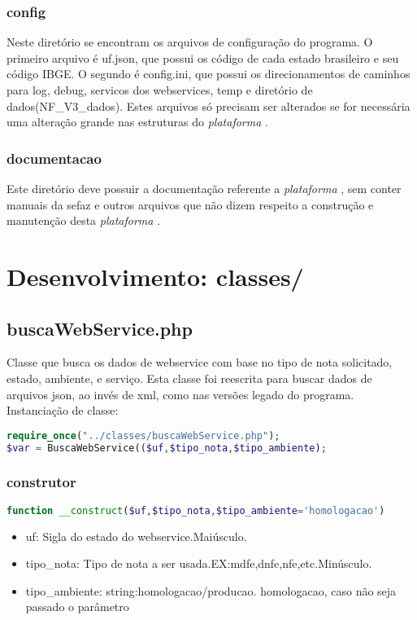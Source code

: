 \documentclass[a4paper]{article}
\newcommand{\nf}{\emph{plataforma} }
\begin{document}
\subsubsection{config}
Neste diretório se encontram os arquivos de configuração do programa. O primeiro arquivo é uf.json, que possui os código de cada estado brasileiro e seu código IBGE. O segundo é config.ini, que possui os direcionamentos de caminhos para log, debug, servicos dos webservices, temp e diretório de dados(NF\_V3\_dados). Estes arquivos só precisam ser alterados se for necessária uma alteração grande nas estruturas do \nf.

\subsubsection{documentacao}
Este diretório deve possuir a documentação referente a \nf, sem conter manuais da sefaz e outros arquivos que não dizem respeito a construção e manutenção desta \nf.

\section{Desenvolvimento: classes/}

\subsection{buscaWebService.php}
Classe que busca os dados de webservice com base no tipo de nota solicitado, estado, ambiente, e serviço. 
Esta classe foi reescrita para buscar dados de arquivos json, ao invés de xml, como nas versões legado do programa.
Instanciação de classe:
\begin{lstlisting}[language=Php]
require_once("../classes/buscaWebService.php");
$var = BuscaWebService(($uf,$tipo_nota,$tipo_ambiente);
\end{lstlisting}
\subsubsection{construtor}
\begin{lstlisting}[language=Php]
function __construct($uf,$tipo_nota,$tipo_ambiente='homologacao')
\end{lstlisting}
\begin{itemize}
	\item uf: Sigla do estado do webservice.Maiúsculo.
	\item tipo\_nota: Tipo de nota a ser usada.EX:mdfe,dnfe,nfe,etc.Minúsculo.
	\item tipo\_ambiente: string:homologacao/producao. homologacao, caso não seja passado o parâmetro
\end{itemize}
\end{document}
